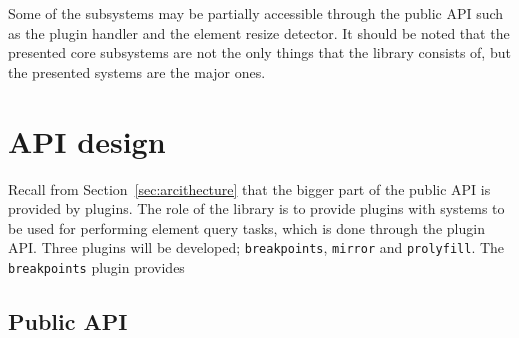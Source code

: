 \documentclass[a4paper,11pt]{kth-mag}
\newcommand{\code}[1]{\texttt{#1}}
\begin{document}
      Some of the subsystems may be partially accessible through the public \gls{API} such as the plugin handler and the \gls{element} resize detector.
      It should be noted that the presented core subsystems are not the only things that the library consists of, but the presented systems are the major ones.
   
    \section{API design}\label{sec:elq-api}
      Recall from Section~\ref{sec:arcithecture} that the bigger part of the public \gls{API} is provided by plugins.
      The role of the library is to provide plugins with systems to be used for performing element query tasks, which is done through the plugin \gls{API}.
      Three plugins will be developed; \code{breakpoints}, \code{mirror} and \code{prolyfill}.
      The \code{breakpoints} plugin provides 

      \subsection{Public API}\label{sec:public-api}
\end{document}
